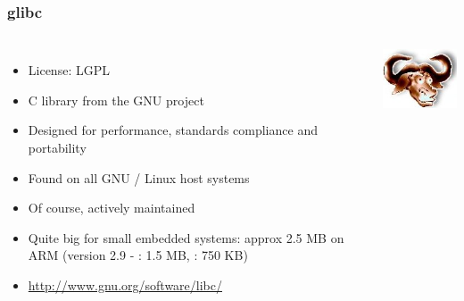 \begin{frame}
  \frametitle{glibc}
  \begin{columns}
    \begin{itemize}
    \item License: LGPL
    \item C library from the GNU project
    \item Designed for performance, standards compliance and portability
    \item Found on all GNU / Linux host systems
    \item Of course, actively maintained
    \item Quite big for small embedded systems: approx 2.5 MB on ARM
      (version 2.9 - : 1.5 MB, : 750 KB)
    \item \url{http://www.gnu.org/software/libc/}
    \end{itemize}
    \includegraphics[width=\textwidth]{slides/sysdev-toolchains-c-libraries/glibc.png}
  \end{columns}
\end{frame}

